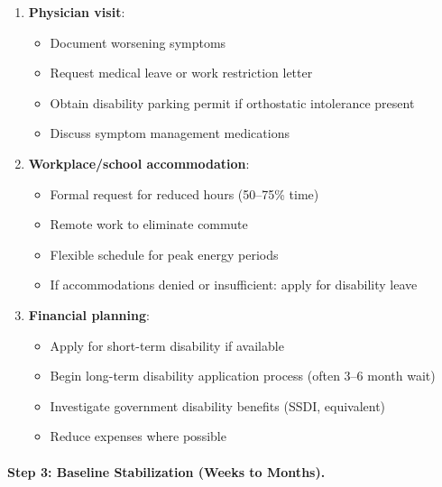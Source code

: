 \begin{enumerate}
    \item \textbf{Physician visit}:
    \begin{itemize}
        \item Document worsening symptoms
        \item Request medical leave or work restriction letter
        \item Obtain disability parking permit if orthostatic intolerance present
        \item Discuss symptom management medications
    \end{itemize}

    \item \textbf{Workplace/school accommodation}:
    \begin{itemize}
        \item Formal request for reduced hours (50--75\% time)
        \item Remote work to eliminate commute
        \item Flexible schedule for peak energy periods
        \item If accommodations denied or insufficient: apply for disability leave
    \end{itemize}

    \item \textbf{Financial planning}:
    \begin{itemize}
        \item Apply for short-term disability if available
        \item Begin long-term disability application process (often 3--6 month wait)
        \item Investigate government disability benefits (SSDI, equivalent)
        \item Reduce expenses where possible
    \end{itemize}
\end{enumerate}

\paragraph{Step 3: Baseline Stabilization (Weeks to Months).}

